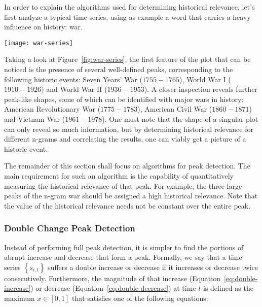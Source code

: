 
In order to explain the algorithms used for determining historical relevance, let's first analyze a typical time series, using as example a word that carries a heavy influence on history: war.

\begin{figure*}[ht]
\centering
\texttt{[image: war-series]}
\caption{Ngram time series for war and slavery}
\label{fig:war-series}
\end{figure*}

Taking a look at Figure~\ref{fig:war-series}, the first feature of the plot that can be noticed is the presence of several well-defined peaks, corresponding to the following historic events: Seven Years' War ($1755 - 1765$), World War I ($1910 - 1926$) and World War II ($1936 - 1953$). A closer inspection reveals further peak-like shapes, some of which can be identified with major wars in history: American Revolutionary War ($1775 - 1783$), American Civil War ($1860 - 1871$) and Vietnam War ($1961 - 1978$). One must note that the shape of a singular plot can only reveal so much information, but by determining historical relevance for different n-grams and correlating the results, one can viably get a picture of a historic event.

The remainder of this section shall focus on algorithms for peak detection. The main requirement for such an algorithm is the capability of quantitatively measuring the historical relevance of that peak. For example, the three large peaks of the n-gram war should be assigned a high historical relevance. Note that the value of the historical relevance needs not be constant over the entire peak.

\subsubsection{Double Change Peak Detection}

Instead of performing full peak detection, it is simpler to find the portions of abrupt increase and decrease that form a peak. Formally, we say that a time series $\left\{ s_{i, t} \right\}$ suffers a double increase or decrease if it increases or decrease twice consecutively. Furthermore, the magnitude of that increase (Equation~\ref{eq:double-increase}) or decrease (Equation~\ref{eq:double-decrease}) at time $t$ is defined as the maximum $x \in \left[ 0, 1 \right]$ that satisfies one of the following equations:

